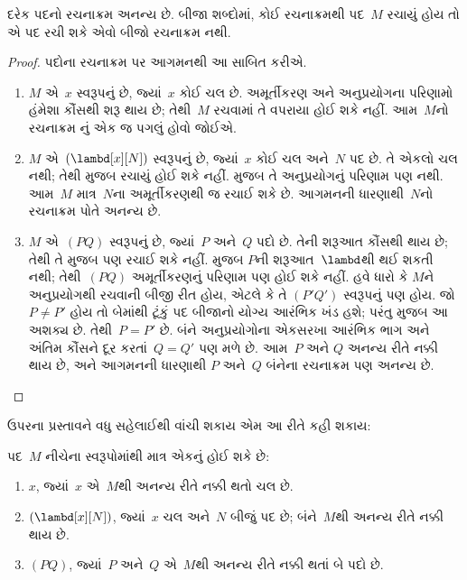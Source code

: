 \begin{prop}[અનન્ય વાંચનીયતા] 
દરેક પદનો રચનાક્રમ અનન્ય છે. બીજા શબ્દોમાં, કોઈ રચનાક્રમથી
પદ~$M$ રચાયું હોય તો એ પદ રચી શકે એવો બીજો રચનાક્રમ નથી.
\end{prop}

\begin{proof}
  પદોના રચનાક્રમ પર આગમનથી આ સાબિત કરીએ.
  \begin{enumerate}
    \item $M$ એ~$x$ સ્વરૂપનું છે, જ્યાં~$x$ કોઈ ચલ છે.
      અમૂર્તીકરણ અને અનુપ્રયોગના પરિણામો હંમેશા કૌંસથી શરૂ
      થાય છે; તેથી~$M$ રચવામાં તે વપરાયા હોઈ શકે નહીં.
      આમ~$M$નો રચનાક્રમ
      નું
      એક જ પગલું હોવો જોઈએ.
    \item $M$ એ~$(\lambd[x][N])$ સ્વરૂપનું છે, જ્યાં~$x$
      કોઈ ચલ અને~$N$ પદ છે. તે એકલો ચલ નથી; તેથી
      મુજબ રચાયું હોઈ શકે નહીં.  મુજબ
      તે અનુપ્રયોગનું પરિણામ પણ નથી. આમ~$M$ માત્ર~$N$ના
      અમૂર્તીકરણથી જ રચાઈ શકે છે. આગમનની ધારણાથી~$N$નો
      રચનાક્રમ પોતે અનન્ય છે.
    \item $M$ એ~$(PQ)$ સ્વરૂપનું છે, જ્યાં~$P$ અને~$Q$
      પદો છે. તેની શરૂઆત કૌંસથી થાય છે; તેથી તે
      મુજબ પણ રચાઈ શકે નહીં.  મુજબ
      $P$ની શરૂઆત~$\lambd$થી થઈ શકતી નથી; તેથી~$(PQ)$
      અમૂર્તીકરણનું પરિણામ પણ હોઈ શકે નહીં. હવે ધારો કે
      $M$ને અનુપ્રયોગથી રચવાની બીજી રીત હોય, એટલે કે તે
      $(P'Q')$ સ્વરૂપનું પણ હોય. જો~$P\neq P'$ હોય તો
      બેમાંથી ટૂંકું પદ બીજાનો યોગ્ય આરંભિક ખંડ હશે; પરંતુ
       મુજબ આ અશક્ય છે. તેથી~$P=P'$ છે.
      બંને અનુપ્રયોગોના એકસરખા આરંભિક ભાગ અને અંતિમ કૌંસને
      દૂર કરતાં~$Q=Q'$ પણ મળે છે. આમ~$P$ અને
      $Q$ અનન્ય રીતે નક્કી થાય છે, અને આગમનની ધારણાથી
      $P$ અને~$Q$ બંનેના રચનાક્રમ પણ અનન્ય છે.
  \end{enumerate}
\end{proof}


ઉપરના પ્રસ્તાવને વધુ સહેલાઈથી વાંચી શકાય એમ આ રીતે કહી શકાય:
\begin{prop}
  પદ~$M$ નીચેના સ્વરૂપોમાંથી માત્ર એકનું હોઈ શકે છે:
  \begin{enumerate}
    \item $x$, જ્યાં~$x$ એ~$M$થી અનન્ય રીતે નક્કી થતો ચલ છે.
    \item $(\lambd[x][N])$, જ્યાં~$x$ ચલ અને~$N$ બીજું
      પદ છે; બંને~$M$થી અનન્ય રીતે નક્કી થાય છે.
    \item $(PQ)$, જ્યાં~$P$ અને~$Q$ એ~$M$થી અનન્ય રીતે
      નક્કી થતાં બે પદો છે.
  \end{enumerate}
\end{prop}
\endgroup


